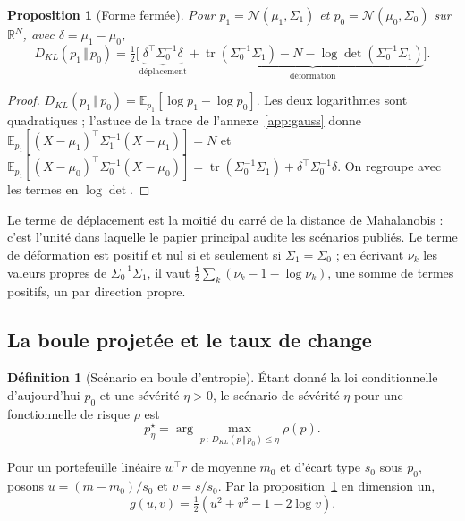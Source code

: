 \documentclass[11pt]{article}
\newtheorem{proposition}{Proposition}
\theoremstyle{definition}
\newtheorem{definition}{Définition}
\theoremstyle{remark}
\newcommand{\KL}[2]{D_{KL}\!\left(#1\,\Vert\,#2\right)}
\begin{document}
\begin{proposition}[Forme fermée]
\label{prop:klgauss}
Pour $p_1=\mathcal N(\mu_1,\Sigma_1)$ et $p_0=\mathcal N(\mu_0,\Sigma_0)$ sur
$\mathbb R^N$, avec $\delta=\mu_1-\mu_0$,
\begin{equation}
\label{eq:klgauss}
\KL{p_1}{p_0}=\tfrac12\Big[\underbrace{\delta^\top\Sigma_0^{-1}\delta}_{\text{déplacement}}
+\underbrace{\operatorname{tr}(\Sigma_0^{-1}\Sigma_1)-N-\log\det(\Sigma_0^{-1}\Sigma_1)}_{\text{déformation}}\Big].
\end{equation}
\end{proposition}

\begin{proof}
$\KL{p_1}{p_0}=\mathbb E_{p_1}[\log p_1-\log p_0]$. Les deux logarithmes sont
quadratiques ; l'astuce de la trace de l'annexe~\ref{app:gauss} donne
$\mathbb E_{p_1}[(X-\mu_1)^\top\Sigma_1^{-1}(X-\mu_1)]=N$ et
$\mathbb E_{p_1}[(X-\mu_0)^\top\Sigma_0^{-1}(X-\mu_0)]
=\operatorname{tr}(\Sigma_0^{-1}\Sigma_1)+\delta^\top\Sigma_0^{-1}\delta$. On
regroupe avec les termes en $\log\det$.
\end{proof}

Le terme de déplacement est la moitié du carré de la distance de Mahalanobis :
c'est l'unité dans laquelle le papier principal audite les scénarios
publiés. Le terme de déformation est positif et nul si et seulement si
$\Sigma_1=\Sigma_0$ ; en écrivant $\nu_k$ les valeurs propres de
$\Sigma_0^{-1}\Sigma_1$, il vaut $\tfrac12\sum_k(\nu_k-1-\log\nu_k)$, une somme de
termes positifs, un par direction propre.

\subsection{La boule projetée et le taux de change}

\begin{definition}[Scénario en boule d'entropie]
Étant donné la loi conditionnelle d'aujourd'hui $p_0$ et une sévérité $\eta>0$,
le scénario de sévérité $\eta$ pour une fonctionnelle de risque $\rho$ est
\begin{equation}
\label{eq:ball}
p^\star_\eta=\arg\max_{p\,:\,\KL{p}{p_0}\le\eta}\rho(p).
\end{equation}
\end{definition}

Pour un portefeuille linéaire $w^\top r$ de moyenne $m_0$ et d'écart type $s_0$
sous $p_0$, posons $u=(m-m_0)/s_0$ et $v=s/s_0$. Par la
proposition~\ref{prop:klgauss} en dimension un,
\begin{equation}
\label{eq:g}
g(u,v)=\tfrac12\left(u^2+v^2-1-2\log v\right).
\end{equation}
\end{document}
